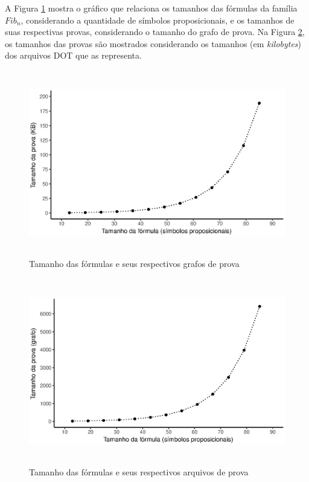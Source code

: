 A Figura \ref{fig:prova_oco_form} mostra o gráfico que relaciona os tamanhos das fórmulas da família $Fib_n$, considerando a quantidade de símbolos proposicionais, e os tamanhos de suas respectivas provas, considerando o tamanho do grafo de prova. Na Figura \ref{fig:prova_siz_form}, os tamanhos das provas são mostrados considerando os tamanhos (em \textit{kilobytes}) dos arquivos DOT que as representa.

\begin{figure}[ht]
  \begin{center}
    \includegraphics[height=230pt,width=400pt]{images/plot_prova_gra_form.eps}
    \caption{Tamanho das fórmulas e seus respectivos grafos de prova}
    \label{fig:prova_oco_form}
  \end{center}
\end{figure}

\begin{figure}[ht]
  \begin{center}
    \includegraphics[height=230pt,width=400pt]{images/plot_prova_kb_form.eps}
    \caption{Tamanho das fórmulas e seus respectivos arquivos de prova}
    \label{fig:prova_siz_form}
  \end{center}
\end{figure}

